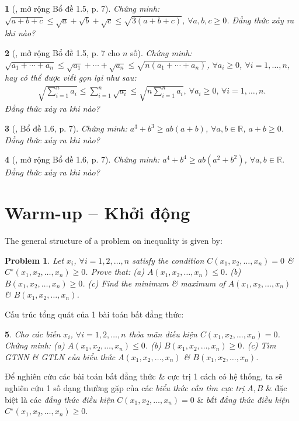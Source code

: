 \documentclass{article}
\newtheorem{baitoan}{}
\newtheorem{problem}{Problem}
\begin{document}
\begin{baitoan}[\cite{Son_Nghiep_Trung_Can_bdt}, mở rộng Bổ đề 1.5, p. 7]
	Chứng minh: $\sqrt{a + b + c}\le\sqrt{a} + \sqrt{b} + \sqrt{c}\le\sqrt{3(a + b + c)}$, $\forall a,b,c\ge 0$. Đẳng thức xảy ra khi nào?
\end{baitoan}

\begin{baitoan}[\cite{Son_Nghiep_Trung_Can_bdt}, mở rộng Bổ đề 1.5, p. 7 cho $n$ số]
	Chứng minh: $\sqrt{a_1 + \cdots + a_n}\le\sqrt{a_1} + \cdots + \sqrt{a_n}\le\sqrt{n(a_1 + \cdots + a_n)}$, $\forall a_i\ge 0$, $\forall i = 1,\ldots,n$, hay có thể được viết gọn lại như sau:
	\begin{align*}
		\sqrt{\sum_{i=1}^n a_i}\le\sum_{i=1}^n \sqrt{a_i}\le\sqrt{n\sum_{i=1}^n a_i},\ \forall a_i\ge 0,\,\forall i = 1,\ldots,n.
	\end{align*}
	Đẳng thức xảy ra khi nào?
\end{baitoan}

\begin{baitoan}[\cite{Son_Nghiep_Trung_Can_bdt}, Bổ đề 1.6, p. 7]
	Chứng minh: $a^3 + b^3\ge ab(a + b)$, $\forall a,b\in\mathbb{R}$, $a + b\ge 0$. Đẳng thức xảy ra khi nào?
\end{baitoan}

\begin{baitoan}[\cite{Son_Nghiep_Trung_Can_bdt}, mở rộng Bổ đề 1.6, p. 7]
	Chứng minh: $a^4 + b^4\ge ab(a^2 + b^2)$, $\forall a,b\in\mathbb{R}$. Đẳng thức xảy ra khi nào?
\end{baitoan}


\section{Warm-up -- Khởi động}
The general structure of a problem on inequality is given by:

\begin{problem}
	Let $x_i$, $\forall i = 1,2,\ldots,n$ satisfy the condition $C(x_1,x_2,\ldots,x_n) = 0$ \& $C^\star(x_1,x_2,\ldots,x_n)\ge0$. Prove that: (a) $A(x_1,x_2,\ldots,x_n)\le0$. (b) $B(x_1,x_2,\ldots,x_n)\ge0$. (c) Find the minimum \& maximum of $A(x_1,x_2,\ldots,x_n)$ \& $B(x_1,x_2,\ldots,x_n)$.
\end{problem}
Cấu trúc tổng quát của 1 bài toán bất đẳng thức:

\begin{baitoan}
	Cho các biến $x_i$, $\forall i = 1,2,\ldots,n$ thỏa mãn điều kiện $C(x_1,x_2,\ldots,x_n) = 0$. Chứng minh: (a) $A(x_1,x_2,\ldots,x_n)\le0$. (b) $B(x_1,x_2,\ldots,x_n)\ge0$. (c) Tìm {\rm GTNN} \& {\rm GTLN} của biểu thức $A(x_1,x_2,\ldots,x_n)$ \& $B(x_1,x_2,\ldots,x_n)$.
\end{baitoan}
Để nghiên cứu các bài toán bất đẳng thức \& cực trị 1 cách có hệ thống, ta sẽ nghiên cứu 1 số dạng thường gặp của các \textit{biểu thức cần tìm cực trị} $A,B$ \& đặc biệt là các \textit{đẳng thức điều kiện} $C(x_1,x_2,\ldots,x_n) = 0$ \& \textit{bất đẳng thức điều kiện} $C^\star(x_1,x_2,\ldots,x_n)\ge0$.
\end{document}
